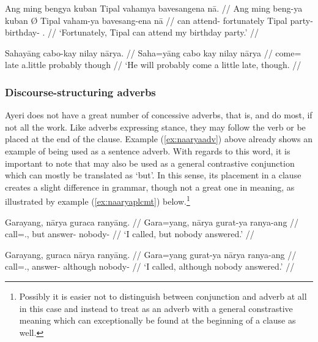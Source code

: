 \pex\label{ex:stanceadv}
\a \begingl
	\gla Ang ming bengya kuban {} Tipal vahamya bavesangena nā. //
	\glb Ang ming beng-ya kuban Ø Tipal vaham-ya bavesang-ena nā //
	\glc \AgtT{} can attend-\TsgM{} fortunately \Top{} Tipal party-\Loc{} 
		birthday-\Gen{} \Fsg{}.\Gen{} //
	\glft `Fortunately, Tipal can attend my birthday party.' //
\endgl

\a\label{ex:naaryaadv} \begingl
	\gla Sahayāng cabo-kay nilay nārya. //
	\glb Saha=yāng {cabo kay} nilay nārya //
	\glc come=\TsgM{} {late a.little} probably though //
	\glft `He will probably come a little late, though. //
\endgl
\xe

\subsubsection{Discourse-structuring adverbs}
\label{subsubsec:discourseadv}

Ayeri does not have a great number of concessive adverbs, that is,
 and  do most, if not all the work. Like adverbs expressing stance,
they may follow the verb or be placed at the end of the clause. Example
(\ref{ex:naaryaadv}) above already shows an example of 
being used as a sentence adverb. With regards to this word, it is important to
note that  may also be used as a general contrastive
conjunction which can mostly be translated as `but'. In this sense, its
placement in a clause creates a slight difference in grammar, though not a
great one in meaning, as illustrated by example (\ref{ex:naaryaplcmt})
below.\footnote{Possibly it is easier not to distinguish between conjunction
and adverb at all in this case and instead to treat  as an
adverb with a general constrastive meaning which can exceptionally be found at
the beginning of a clause as well.\label{fn:naaryapos}}

\pex\label{ex:naaryaplcmt}
\a\label{ex:naaryaconj}\begingl
	\gla Garayang, nārya guraca ranyāng. //
	\glb Gara=yang, nārya gurat-ya ranya-ang //
	\glc call=\Fsg{}.\Aarg{}, but answer-\TsgM{} nobody-\Aarg{} //
	\glft `I called, but nobody answered.' //
\endgl

\a\label{ex:naaryaadv2}\begingl
	\gla Garayang, guraca nārya ranyāng. //
	\glb Gara=yang gurat-ya nārya ranya-ang //
	\glc call=\Fsg{}.\Aarg{}, answer-\TsgM{} although nobody-\Aarg{} //
	\glft `I called, although nobody answered.' //
\endgl

\xe

